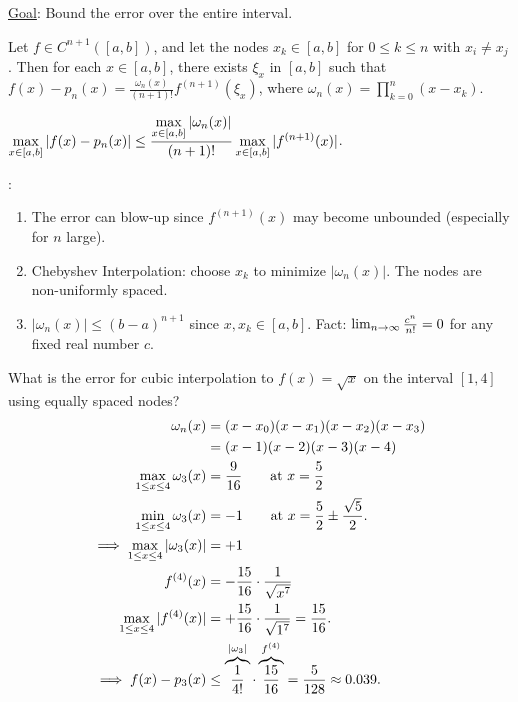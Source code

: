 \documentclass[]{article}
\begin{document}
\ul{Goal}: Bound the error over the entire interval.

\begin{theorem}
	Let $f\in C^{n+1}([a,b])$, and let the nodes $x_k\in[a,b]$ for $0\leq k\leq n$ with $x_i\neq x_j$.
	Then for each $x\in[a,b]$, there exists $\xi_x$ in $[a,b]$ such that $f(x)-p_n(x) = \frac{\omega_n(x)}{(n+1)!}f^{(n+1)}(\xi_x)$, where $\omega_n(x) = \prod_{k=0}^n (x-x_k)$.
\end{theorem}
\begin{corollary}
	$\ds \max_{x\in[a,b]} |f(x)-p_n(x)| \leq \frac{\ds\max_{x\in[a,b]}|\omega_n(x)|}{(n+1)!} \max_{x\in[a,b]} |f^{(n+1)}(x)|$.
\end{corollary}
\begin{note}:
	\begin{enumerate}
		\item The error can blow-up since $f^{(n+1)}(x)$ may become unbounded (especially for $n$ large).
		\item Chebyshev Interpolation: choose $x_k$ to minimize $|\omega_n(x)|$.
			The nodes are non-uniformly spaced.
		\item $|\omega_n(x)| \leq (b-a)^{n+1}$ since $x,x_k\in[a,b]$.
			Fact: $\lim_{n\ra\infty} \frac{c^n}{n!} = 0$ for any fixed real number $c$.
	\end{enumerate}
\end{note}
\begin{example}
	What is the error for cubic interpolation to $f(x)=\sqrt x$ on the interval $[1,4]$ using equally spaced nodes?
	\begin{align*}
		\omega_n(x) &= (x-x_0)(x-x_1)(x-x_2)(x-x_3) \\
					&= (x-1)(x-2)(x-3)(x-4) \\
		\max_{1\leq x\leq 4} \omega_3(x) &= \frac9{16} \qquad\text{at }x=\frac52 \\
		\min_{1\leq x\leq 4} \omega_3(x) &= -1 \qquad \text{at } x=\frac52\pm\frac{\sqrt5}2.\\
		\implies \max_{1\leq x\leq 4} |\omega_3(x)| &= +1 \\
		f^{(4)}(x) &= -\frac{15}{16} \cdot \frac1{\sqrt{x^7}} \\
		\max_{1\leq x\leq 4} |f^{(4)}(x)| &= +\frac{15}{16}\cdot\frac1{\sqrt{1^7}} = \frac{15}{16}. \\
		\implies f(x)-p_3(x) &\leq \ob{|\omega_3|}{\frac1{4!}}\cdot\ob{f^{(4)}}{\frac{15}{16}} = \frac5{128} \approx 0.039.
	\end{align*}
\end{example}
\end{document}
